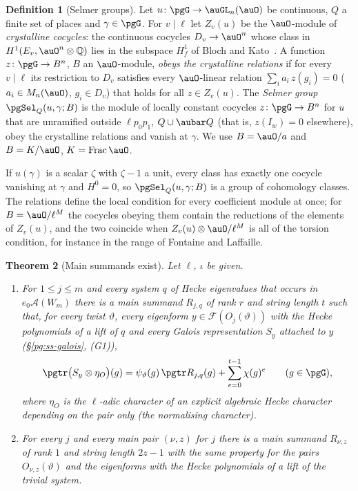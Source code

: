 \documentclass[10pt]{amsart}
\newtheorem{theorem}{Theorem}[section]
\theoremstyle{definition}
\newtheorem{definition}[theorem]{Definition}
\theoremstyle{remark}
\newcommand{\Q}{\mathbb Q}
\begin{document}
\begin{definition}[Selmer groups]\label{pg:def-sel}
Let $u\colon\pgG\to\auGL_n(\auO)$ be continuous, $Q$ a finite set of places and $\gamma\in\pgG$.
For $v\mid\ell$ let $Z_v(u)$ be the $\auO$-module of \emph{crystalline cocycles}: the continuous
cocycles $D_v\to\auO^n$ whose class in $H^1(E_v,\auO^n\otimes\Q)$ lies in the subspace $H^1_f$ of
Bloch and Kato~\cite[(3.7.2)]{BlochKato}. A function $z\colon\pgG\to B^n$, $B$ an $\auO$-module,
\emph{obeys the crystalline relations} if for every $v\mid\ell$ its restriction to $D_v$ satisfies
every $\auO$-linear relation $\sum_ia_i\,z(g_i)=0$ ($a_i\in M_n(\auO)$, $g_i\in D_v$) that holds
for all $z\in Z_v(u)$. The \emph{Selmer group} $\pgSel_Q(u,\gamma;B)$ is the module of locally
constant cocycles $z\colon\pgG\to B^n$ for $u$ that are unramified outside $\ell p_0p_1$,
$Q\cup\aubar Q$ (that is, $z(I_w)=0$ elsewhere), obey the crystalline relations and vanish at
$\gamma$. We use $B=\auO/a$ and $B=K/\auO$, $K=\operatorname{Frac}\auO$.
\end{definition}

If $u(\gamma)$ is a scalar $\zeta$ with $\zeta-1$ a unit, every class has exactly one cocycle
vanishing at $\gamma$ and $H^0=0$, so $\pgSel_Q(u,\gamma;B)$ is a group of cohomology classes. The
relations define the local condition for every coefficient module at once; for $B=\auO/\ell^M$
the cocycles obeying them contain the reductions of the elements of $Z_v(u)$, and the two coincide
when $Z_v(u)\otimes\auO/\ell^M$ is all of the torsion condition, for instance in the range of
Fontaine and Laffaille.

\begin{theorem}[Main summands exist]\label{pg:I}
Let $\ell$, $\iota$ be given.
\begin{enumerate}
\item[(a)] For $1\le j\le m$ and every system $q$ of Hecke eigenvalues that occurs in
$e_0\mathcal A(W_m)$ there is a main summand $R_{j,q}$ of rank $r$ and string length $t$ such
that, for every twist $\vartheta$, every eigenform $y\in\mathcal F(O_j(\vartheta))$ with the
Hecke polynomials of a lift of $q$ and every Galois representation $S_y$ attached to $y$
(\S\ref{pg:ss-galois}, (G1)),
\begin{equation}\label{pg:eq-trace}
\pgtr\bigl(S_y\otimes\eta_O\bigr)(g)=\psi_\vartheta(g)\,\pgtr R_{j,q}(g)+\sum_{e=0}^{t-1}\chi(g)^e
\qquad(g\in\pgG),
\end{equation}
where $\eta_O$ is the $\ell$-adic character of an explicit algebraic Hecke character depending on
the pair only (the \emph{normalising character}).
\item[(b)] For every $j$ and every main pair $(\nu,z)$ for $j$ there is a main summand
$R_{\nu,z}$ of rank $1$ and string length $2z-1$ with the same property for the pairs
$O_{\nu,z}(\vartheta)$ and the eigenforms with the Hecke polynomials of a lift of the trivial
system.
\end{enumerate}
\end{theorem}
\end{document}
